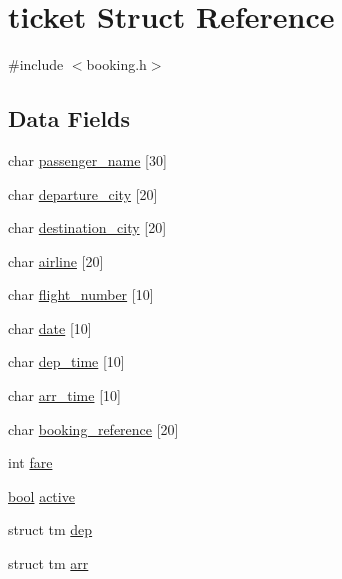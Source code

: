 \hypertarget{structticket}{\section{ticket Struct Reference}
\label{structticket}
}


{\ttfamily \#include $<$booking.\+h$>$}

\subsection*{Data Fields}
\begin{DoxyCompactItemize}
\item 
char \hyperlink{structticket_ac52977b4e30a262ba97c8bd1ac6dbdc9}{passenger\+\_\+name} \mbox{[}30\mbox{]}
\item 
char \hyperlink{structticket_a1d6b301226a292359356534054313067}{departure\+\_\+city} \mbox{[}20\mbox{]}
\item 
char \hyperlink{structticket_a1dc9ea1dcc21a6c198a5d040ccea89ff}{destination\+\_\+city} \mbox{[}20\mbox{]}
\item 
char \hyperlink{structticket_a3acb4e05ce192acb1ef223ec62891725}{airline} \mbox{[}20\mbox{]}
\item 
char \hyperlink{structticket_ab8bdf6615eae3d233291ab4be030df2a}{flight\+\_\+number} \mbox{[}10\mbox{]}
\item 
char \hyperlink{structticket_ae4d2e27c920650bc6325d0e81cf829d9}{date} \mbox{[}10\mbox{]}
\item 
char \hyperlink{structticket_a5551ea610d8edcc9716180b2c97ccde4}{dep\+\_\+time} \mbox{[}10\mbox{]}
\item 
char \hyperlink{structticket_af7a1201bf0b204f2be1f257b2c0bde68}{arr\+\_\+time} \mbox{[}10\mbox{]}
\item 
char \hyperlink{structticket_adbddfa1cf9fa643c6cea63f5ea3006a4}{booking\+\_\+reference} \mbox{[}20\mbox{]}
\item 
int \hyperlink{structticket_af79afaf9c850bee6ec68f883d359c068}{fare}
\item 
\hyperlink{booking_8h_af6a258d8f3ee5206d682d799316314b1}{bool} \hyperlink{structticket_a823f183077ae42b41a4f00941da72430}{active}
\item 
struct tm \hyperlink{structticket_a4bd2f22d43528cbdd9b4cc1d4ea5754f}{dep}
\item 
struct tm \hyperlink{structticket_a7316ad33eb22844503746b7542bb2903}{arr}
\end{DoxyCompactItemize}


